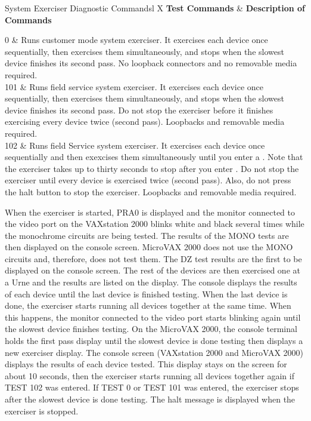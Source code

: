 \begin{tbl}{System Exerciser Diagnostic Commands}{l X}
\textbf{Test Commands} 	&	\textbf{Description of Commands} \\
\hline

0						&	Runs customer mode system exerciser. It exercises 
							each device once sequentially, then exercises them 
							simultaneously, and stops when the slowest device
							finishes its second pass. No loopback connectors 
							and no removable media required. \\

101						&	Runs field service system exerciser. It exercises 
							each device once sequentially, then exercises them 
							simultaneously, and stops when the slowest device 
							finishes its second pass. Do not stop the exerciser 
							before it finishes exercising every device twice 
							(second pass). Loopbacks and removable media required. \\

102						&	Runs field Service system exerciser. It exercises each 
							device once sequentially and then exexcises them 
							simultaneously until you enter a . 
							Note that the exerciser takes up to thirty seconds 
							to stop after you enter . Do
							not stop the exerciser until every device is exercised 
							twice (second pass). Also, do not press the halt button 
							to stop the exerciser. Loopbacks and removable media required. \\
\end{tbl}

When the exerciser is started, PRA0 is displayed and the monitor connected
to the video port on the VAXstation 2000 blinks white and black several
times while the monochrome circuits are being tested. The results of the
MONO tests are then displayed on the console screen. MicroVAX 2000
does not use the MONO circuits and, therefore, does not test them. The
DZ test results are the first to be displayed on the console screen. The rest
of the devices are then exercised one at a Urne and the results are listed
on the display. The console displays the results of each device until the
last device is finished testing. When the last device is done, the exerciser
starts running all devices together at the same time. When this happens, the
monitor connected to the video port starts blinking again until the slowest
device finishes testing. On the MicroVAX 2000, the console terminal holds
the first pass display until the slowest device is done testing then displays a
new exerciser display. The console screen (VAXstation 2000 and MicroVAX
2000) displays the results of each device tested. This display stays on the
screen for about 10 seconds, then the exerciser starts running all devices
together again if TEST 102 was entered. If TEST 0 or TEST 101 was entered,
the exerciser stops after the slowest device is done testing. The halt message
is displayed when the exerciser is stopped.

